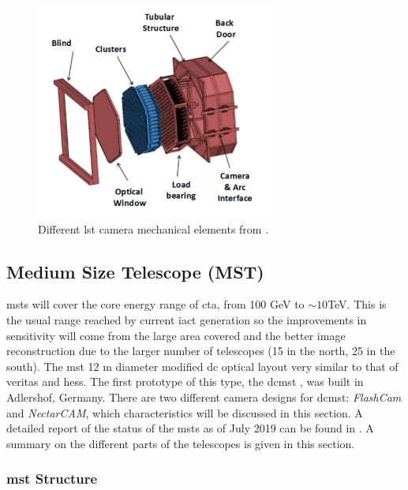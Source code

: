 \documentclass[main.tex]{subfiles}
\begin{document}
\begin{figure}[h]
\centering
 \includegraphics[width=0.7\textwidth]{Pictures/LSTcamerastructure.pdf}
  \caption{Different \gls{lst} camera mechanical elements from \cite{2013LSTCamMech}.}
    \label{fig:LSTcammech}
\end{figure}

\subsection{Medium Size Telescope (MST)} \label{sec:MST}

\glspl{mst} will cover the core energy range of \gls{cta}, from 100 GeV to $\sim 10$TeV. This is the usual range reached by current \gls{iact} generation so the improvements in sensitivity will come from the large area covered and the better image reconstruction due to the larger number of telescopes (15 in the north, 25 in the south).
The \gls{mst} 12 m diameter modified \gls{dc} optical layout very similar to that of \gls{veritas} and \gls{hess}. The first prototype of this type, the \gls{dcmst} \cite{2017SCMSTstatus}, was built in Adlershof, Germany. There are two different camera designs for \gls{dcmst}: \textit{FlashCam} and \textit{NectarCAM}, which characteristics will be discussed in this section.
A detailed report of the status of the \glspl{mst} as of July 2019 can be found in \cite{2019MSTreport}. A summary on the different parts of the telescopes is given in this section.

\subsubsection{\gls{mst} Structure}
\end{document}

